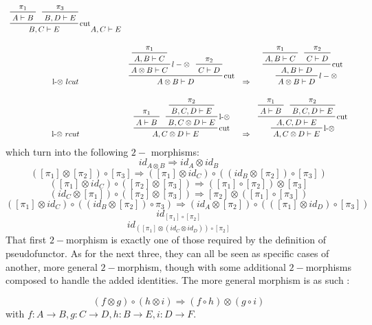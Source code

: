 \documentclass[a4paper, 12pt, twoside,openright]{report}
\begin{document}
$$\begin{array}{cccc}
	{\prftree[r]{cut}
		{\prftree{\pi_1}{A\vdash B}}
		{\prftree{\pi_3}{B,D\vdash E}}
		{B,C\vdash E}
	}
	{A,C \vdash E}
\\
\\
\text{l-$\otimes$ } lcut
&
 \prftree[r]{cut}
	{
		\prftree[r]{$l-\otimes$}
		{\prftree{\pi_1}{A,B\vdash C}}
		{A \otimes B \vdash C}
	}
	{\prftree{\pi_2}{C\vdash D}}
	{A \otimes B \vdash D}
&
\Rightarrow
&
\prftree[r]{$l-\otimes$}
	{
	\prftree[r]{cut}
		{\prftree{\pi_1}{A,B\vdash C}}
		{\prftree{\pi_2}{C\vdash D}}
		{A,B \vdash D}
	}
	{A \otimes B \vdash D}
\\
\\
\text{l-$\otimes$ } rcut
&
\prftree[r]{cut}
	{\prftree{\pi_1}{A\vdash B}}
	{
		\prftree[r]{l-$\otimes$}
			{\prftree{\pi_2}{B,C,D\vdash E}}
			{B,C\otimes D \vdash E}
	}
	{A,C\otimes D \vdash E}
&
\Rightarrow
&
\prftree[r]{l-$\otimes$}
	{
		\prftree[r]{cut}
			{\prftree{\pi_1}{A\vdash B}}
			{\prftree{\pi_2}{B,C,D\vdash E}}
		{A,C,D \vdash E}
	}	
	{A,C\otimes D \vdash E}	
\end{array}%
$$
which turn into the following $2-$ morphisms:
$$id_{A\otimes B} \Rightarrow id_A \otimes id_B$$
$$([\pi_1] \otimes [\pi_2]) \circ [\pi_3] \Rightarrow ([\pi_1] \otimes id_C) \circ ((id_B \otimes [\pi_2]) \circ [\pi_3])$$
$$([\pi_1] \otimes id_C) \circ ([\pi_2] \otimes [\pi_3]) \Rightarrow ([\pi_1] \circ [\pi_2]) \otimes [\pi_3] $$
$$(  id_C \otimes [\pi_1]) \circ ([\pi_2] \otimes [\pi_3]) \Rightarrow  [\pi_2] \otimes ([\pi_1] \circ[\pi_3])$$
$$([\pi_1] \otimes id_C) \circ ((id_B \otimes [\pi_2]) \circ \pi_3) \Rightarrow (id_A \otimes [\pi_2]) \circ (([\pi_1] \otimes id_D) \circ [\pi_3]) $$
$$id_{[\pi_1]\circ [\pi_2]}$$
$$id_{([\pi_1] \otimes (id_C \otimes id_D)) \circ [\pi_2]}$$
That first $2-$morphism is exactly one of those required by the definition of pseudofunctor. As for the next three, they can all be seen as specific cases of another, more general $2-$morphism, though with some additional $2-$morphisms composed to handle the added identities. The more general morphism is as such : 

$$(f \otimes g) \circ (h \otimes i) \Rightarrow (f\circ h) \otimes (g \circ i)$$ with $f: A\rightarrow B, g:C \rightarrow D, h:B \rightarrow E, i: D\rightarrow F$.\\
\end{document}
